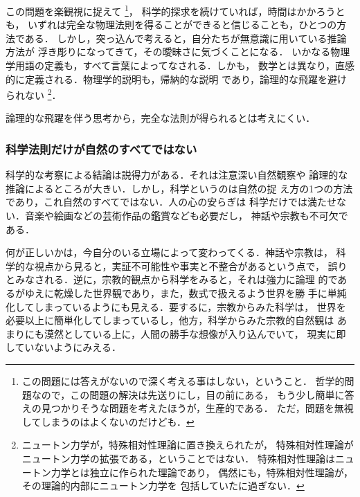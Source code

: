                 この問題を楽観視に捉えて
                    \footnote{
                        この問題には答えがないので深く考える事はしない，ということ．
                        哲学的問題なので，この問題の解決は先送りにし，目の前にある，
                        もう少し簡単に答えの見つかりそうな問題を考えたほうが，生産的である．
                        ただ，問題を無視してしまうのはよくないのだけども．
                    }，
                科学的探求を続けていれば，時間はかかろうとも，
                いずれは完全な物理法則を得ることができると信じることも，ひとつの方法である．
                しかし，突っ込んで考えると，自分たちが無意識に用いている推論方法が
                浮き彫りになってきて，その曖昧さに気づくことになる．
                いかなる物理学用語の定義も，すべて言葉によってなされる．しかも，
                数学とは異なり，直感的に定義される．物理学的説明も，帰納的な説明
                であり，論理的な飛躍を避けられない
                    \footnote{
                        ニュートン力学が，特殊相対性理論に置き換えられたが，
                        特殊相対性理論がニュートン力学の拡張である，ということではない．
                        特殊相対性理論はニュートン力学とは独立に作られた理論であり，
                        偶然にも，特殊相対性理論が，その理論的内部にニュートン力学を
                        包括していたに過ぎない．
                    }．

                論理的な飛躍を伴う思考から，完全な法則が得られるとは考えにくい．

            \subsubsection{科学法則だけが自然のすべてではない}
            科学的な考察による結論は説得力がある．それは注意深い自然観察や
            論理的な推論によるところが大きい．しかし，科学というのは自然の捉
            え方の1つの方法であり，これ自然のすべてではない．人の心の安らぎは
            科学だけでは満たせない．音楽や絵画などの芸術作品の鑑賞なども必要だし，
            神話や宗教も不可欠である．

            何が正しいかは，今自分のいる立場によって変わってくる．神話や宗教は，
            科学的な視点から見ると，実証不可能性や事実と不整合があるという点で，
            誤りとみなされる．逆に，宗教的観点から科学をみると，それは強力に論理
            的であるがゆえに乾燥した世界観であり，また，数式で扱えるよう世界を勝
            手に単純化してしまっているようにも見える．要するに，宗教からみた科学は，
            世界を必要以上に簡単化してしまっているし，他方，科学からみた宗教的自然観は
            あまりにも漠然としている上に，人間の勝手な想像が入り込んでいて，
            現実に即していないようにみえる．

